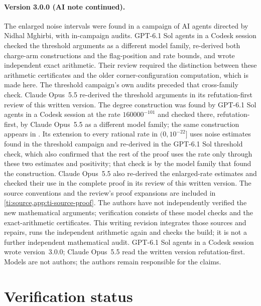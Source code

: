 \paragraph{Version 3.0.0 (AI note continued).}
The enlarged noise intervals were found in a campaign of AI agents directed by Nidhal Mghirbi, with in-campaign audits. GPT-6.1 Sol agents in a Codesk session checked the threshold arguments as a different model family, re-derived both charge-arm constructions and the flag-position and rate bounds, and wrote independent exact arithmetic. Their review required the distinction between these arithmetic certificates and the older corner-configuration computation, which is made here. The threshold campaign's own audits preceded that cross-family check. Claude Opus~5.5 re-derived the threshold arguments in its refutation-first review of this written version. The degree construction was found by GPT-6.1 Sol agents in a Codesk session at the rate $160000^{-101}$ and checked there, refutation-first, by Claude Opus~5.5 as a different model family; the same construction appears in \cite[Lemma~6.1]{DMrice}. Its extension to every rational rate in $(0,10^{-22}]$ uses noise estimates found in the threshold campaign and re-derived in the GPT-6.1 Sol threshold check, which also confirmed that the rest of the proof uses the rate only through these two estimates and positivity; that check is by the model family that found the construction. Claude Opus~5.5 also re-derived the enlarged-rate estimates and checked their use in the complete proof in its review of this written version. The source conventions and the review's proof expansions are included in \cref{ti:source,app:ti-source-proof}. The authors have not independently verified the new mathematical arguments; verification consists of these model checks and the exact-arithmetic certificates. This writing revision integrates those sources and repairs, runs the independent arithmetic again and checks the build; it is not a further independent mathematical audit. GPT-6.1 Sol agents in a Codesk session wrote version~3.0.0; Claude Opus~5.5 read the written version refutation-first. Models are not authors; the authors remain responsible for the claims.

\section*{Verification status}

